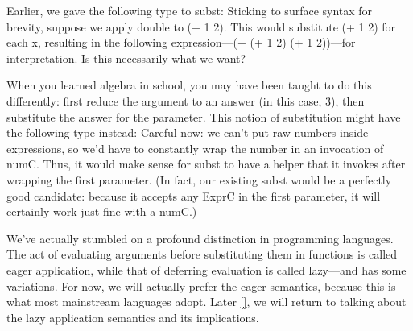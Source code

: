 
Earlier, we gave the following type to subst:
Sticking to surface syntax for brevity, suppose we apply double to (+ 1 2). This
would substitute (+ 1 2) for each x, resulting in the following expression—(+ (+
1 2) (+ 1 2))—for interpretation. Is this necessarily what we want?

When you learned algebra in school, you may have been taught to do this
differently: first reduce the argument to an answer (in this case, 3), then
substitute the answer for the parameter. This notion of substitution might have
the following type instead:
Careful now: we can’t put raw numbers inside expressions, so we’d have to
constantly wrap the number in an invocation of numC. Thus, it would make sense
for subst to have a helper that it invokes after wrapping the first parameter.
(In fact, our existing subst would be a perfectly good candidate: because it
accepts any ExprC in the first parameter, it will certainly work just fine with
a numC.)


We’ve actually stumbled on a profound distinction in programming languages. The
act of evaluating arguments before substituting them in functions is called
eager application, while that of deferring evaluation is called lazy—and has
some variations. For now, we will actually prefer the eager semantics, because
this is what most mainstream languages adopt. Later \ref{}, we will return to
talking about the lazy application semantics and its implications.
